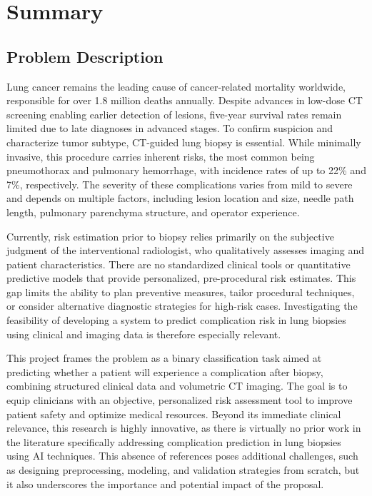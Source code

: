 %

\chapter{Summary}

\section*{Problem Description}

Lung cancer remains the leading cause of cancer-related mortality worldwide, responsible for over 1.8 million deaths annually. Despite advances in low-dose CT screening enabling earlier detection of lesions, five-year survival rates remain limited due to late diagnoses in advanced stages. To confirm suspicion and characterize tumor subtype, CT-guided lung biopsy is essential. While minimally invasive, this procedure carries inherent risks, the most common being pneumothorax and pulmonary hemorrhage, with incidence rates of up to 22\% and 7\%, respectively. The severity of these complications varies from mild to severe and depends on multiple factors, including lesion location and size, needle path length, pulmonary parenchyma structure, and operator experience.

Currently, risk estimation prior to biopsy relies primarily on the subjective judgment of the interventional radiologist, who qualitatively assesses imaging and patient characteristics. There are no standardized clinical tools or quantitative predictive models that provide personalized, pre-procedural risk estimates. This gap limits the ability to plan preventive measures, tailor procedural techniques, or consider alternative diagnostic strategies for high-risk cases. Investigating the feasibility of developing a system to predict complication risk in lung biopsies using clinical and imaging data is therefore especially relevant.

This project frames the problem as a binary classification task aimed at predicting whether a patient will experience a complication after biopsy, combining structured clinical data and volumetric CT imaging. The goal is to equip clinicians with an objective, personalized risk assessment tool to improve patient safety and optimize medical resources. Beyond its immediate clinical relevance, this research is highly innovative, as there is virtually no prior work in the literature specifically addressing complication prediction in lung biopsies using AI techniques. This absence of references poses additional challenges, such as designing preprocessing, modeling, and validation strategies from scratch, but it also underscores the importance and potential impact of the proposal.

